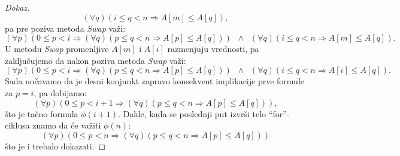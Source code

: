 \begin{proof}[Dokaz]
  $$
    (\forall q)(i \le q < n \Rightarrow A[m] \le A[q]),
  $$
  pa pre poziva metoda \textit{Swap} va\v zi:
  $$
    (\forall p)(0 \le p < i \Rightarrow (\forall q)(p \le q < n \Rightarrow A[p] \le A[q]))
    \;\;\land\;\;
    (\forall q)(i \le q < n \Rightarrow A[m] \le A[q]).
  $$
  U metodu \textit{Swap} promenljive $A[m]$ i $A[i]$ razmenjuju vrednosti, pa zaklju\v cujemo
  da nakon poziva metoda \textit{Swap} va\v zi:
  $$
    (\forall p)(0 \le p < i \Rightarrow (\forall q)(p \le q < n \Rightarrow A[p] \le A[q]))
    \;\;\land\;\;
    (\forall q)(i \le q < n \Rightarrow A[i] \le A[q]).
  $$
  Sada uo\v cavamo da je desni konjunkt zapravo konsekvent implikacije prve formule za $p = i$, pa dobijamo:
  $$
    (\forall p)(0 \le p < i + 1 \Rightarrow (\forall q)(p \le q < n \Rightarrow A[p] \le A[q])),
  $$
  \v sto je ta\v cno formula $\phi(i + 1)$.
  Dakle, kada se poslednji put izvr\v si telo ``for''-ciklusa znamo da \'ce va\v ziti $\phi(n)$:
  $$
    (\forall p)(0 \le p < n \Rightarrow (\forall q)(p \le q < n \Rightarrow A[p] \le A[q]))
  $$
  \v sto je i trebalo dokazati.
\end{proof}
\endinput

ZADACI:

Svaki broj se mo\v ze zapisati kao zbir razli\v citih stepena broja~2.

Neka je niz $a_1, a_2, a_3, \ldots$ celih brojeva definisan ovako:
$$
  a_1 = 1, a_2 = 2, a_3 = 3, a_n = a_{n-1} + a_{n-2} + a_{n-3}$. Dokazati da je $a_n < 2^n$ za sve $n$.
$$

Neka je niz $a_1, a_2, a_3, \ldots$ celih brojeva definisan ovako:
$$
  a_1 = 1, a_2 = 3, a_3 = 7, a_n = a_{n-1} + a_{n-2} + a_{n-3}$. Dokazati da su svi $a_n$ neparni.
$$































